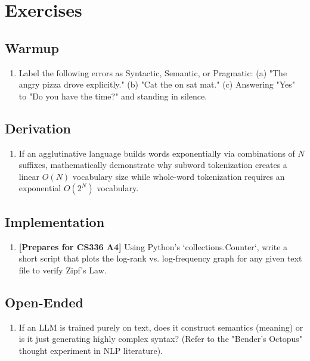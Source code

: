 \section{Exercises}
\label{ch:05:sec:exercises}

\subsection*{Warmup}
\begin{enumerate}
  \item Label the following errors as Syntactic, Semantic, or Pragmatic: 
        (a) "The angry pizza drove explicitly." 
        (b) "Cat the on sat mat."
        (c) Answering "Yes" to "Do you have the time?" and standing in silence.
\end{enumerate}

\subsection*{Derivation}
\begin{enumerate}
  \item If an agglutinative language builds words exponentially via combinations of $N$ suffixes, mathematically demonstrate why subword tokenization creates a linear $O(N)$ vocabulary size while whole-word tokenization requires an exponential $O(2^N)$ vocabulary.
\end{enumerate}

\subsection*{Implementation}
\begin{enumerate}
  \item \textbf{[Prepares for CS336 A4]} Using Python's `collections.Counter`, write a short script that plots the log-rank vs. log-frequency graph for any given text file to verify Zipf's Law.
\end{enumerate}

\subsection*{Open-Ended}
\begin{enumerate}
  \item If an LLM is trained purely on text, does it construct semantics (meaning) or is it just generating highly complex syntax? (Refer to the "Bender's Octopus" thought experiment in NLP literature). 
\end{enumerate}

